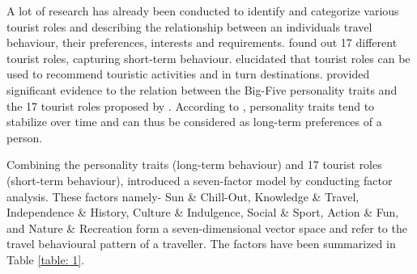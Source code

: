 A lot of research has already been conducted to identify and categorize various tourist roles and describing the relationship between an individual\textquotesingle s travel behaviour, their preferences, interests and requirements. \cite{gibson2002tourist} found out 17 different tourist roles, capturing short-term behaviour. \cite{gretzel2006travel} elucidated that tourist roles can be used to recommend touristic activities and in turn destinations. \cite{delic2016sun} provided significant evidence to the relation between the Big-Five personality traits \cite{goldberg1990alternative} and the 17 tourist roles proposed by \cite{gibson2002tourist}. According to \cite{woszczynski2002exploring}, personality traits tend to stabilize over time and can thus be considered as long-term preferences of a person.

Combining the personality traits (long-term behaviour) and 17 tourist roles (short-term behaviour), \cite{neidhardt2015picture} introduced a seven-factor model by conducting factor analysis. These factors namely- Sun \& Chill-Out, Knowledge \& Travel, Independence \& History, Culture \& Indulgence, Social \& Sport, Action \& Fun, and Nature \& Recreation form a seven-dimensional vector space and refer to the travel behavioural pattern of a traveller. The factors have been summarized in Table \ref{table: 1}.

